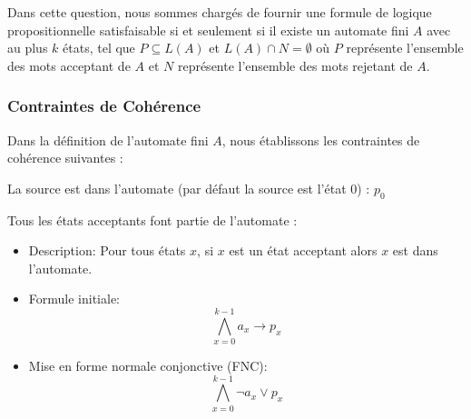 \label{question 1}
Dans cette question, nous sommes chargés de fournir une formule de logique propositionnelle satisfaisable si et seulement si il existe un automate fini \( A \) avec au plus \( k \) états, tel que \( P \subseteq L(A) \) et \( L(A) \cap N = \emptyset \) où \( P \) représente l'ensemble des mots acceptant de \( A \) et \( N \) représente l'ensemble des mots rejetant de \( A \).

\subsubsection*{Contraintes de Cohérence}
\label{cohérence}

Dans la définition de l'automate fini \( A \), nous établissons les contraintes de cohérence suivantes :

\begin{tcolorbox}[defaultstyle,title=Contrainte 1]
   La source est dans l'automate (par défaut la source est l'état \( 0 \)) : \hspace{0.5cm}\( p_{0} \)
\end{tcolorbox}


\begin{tcolorbox}[defaultstyle,title=Contrainte 2]
    Tous les états acceptants font partie de l'automate :
    \begin{itemize}
        \item Description: Pour tous états \( x \), si \( x \) est un état acceptant alors \( x \) est dans l'automate.\\
        \item Formule initiale: \[ \bigwedge\limits_{x=0}^{k-1}a_{x}\rightarrow p_{x} \]
        \item Mise en forme normale conjonctive (FNC): \[ \bigwedge\limits_{x=0}^{k-1} \lnot a_{x} \lor p_{x} \]
    \end{itemize}
\end{tcolorbox}


